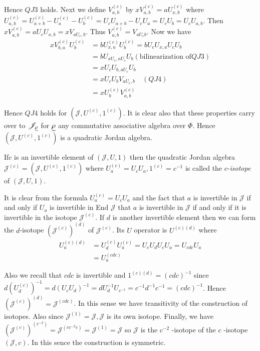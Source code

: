 Hence $QJ3$ holds. Next we define $V_{a,b}^{(c)}$ by
$xV_{a,b}^{(c)}=aU_{x,b}^{(c)}$ where
$U_{a,b}^{(c)}=U_{a+b}^{(c)}-U_a^{(c)}-U_b^{(c)}=U_cU_{a+b}-U_cU_a=U_cU_b=U_c
U_{a,b}$. Then $xV_{a,b}^{(c)}=aU_c U_{x,b}=xV_{aU_c,b}$. Thus
$V_{a,b}^{(c)}=V_{aU_{c}b}$. Now we have
\begin{align*}
  xV_{b,a}^{(c)}U_b^{(c)}&=bU_{x,a}^{(c)}U_b^{(c)}=bU_cU_{x,a}U_cU_b\\
  &=b U_{xU_c,aU_c}U_b(\text{bilinearization of} QJ 3)\\
  &=xU_c U_{b,aU_c}U_b\\
  &=xU_cU_b V_{aU_c,b}\quad (QJ 4)\\
  &=xU_b^{(c)}V_{a,b}^{(c)}
\end{align*}

Hence $QJ4$ holds for $(\mathscr{J}, U^{(c)},1^{(c)})$. It is clear
also that these properties carry over to $\mathscr{J}_{\underline{\rho}}$ for
$\underline{\rho}$ any commutative associative algebra over $\Phi$. Hence
$(\mathscr{J}, U^{(c)}, 1^{(c)})$ is a quadratic Jordan algebra.

\begin{defn}\label{c1:defn6}
  If\pageoriginale $c$ is an invertible element of $(\mathscr{J},U,1)$ then the
  quadratic Jordan algebra
  $\mathscr{J}^{(c)}=(\mathscr{J},U^{(c)},1^{(c)})$ where
  $U_a^{(c)}=U_cU_a,1^{(c)}=c^{-1}$ is called the $c$-{\em isotope} of
  $(\mathscr{J},U,1)$. 
\end{defn}

It is clear from the formula $U_a^{(c)}=U_cU_a$ and the fact that $a$
is invertible in $\mathscr{J}$ if and only if $U_a$ is invertible in
End $\mathscr{J}$ that $a$ is invertible in $\mathscr{J}$ if and only
if it is invertible in the isotope $\mathscr{J}^{(c)}$. If $d$ is
another invertible element then we can form the $d$-isotope
$(\mathscr{J}^{(c)})^{(d)}$ of $\mathscr{J}^{(c)}$. Its $U$ operator
is $U^{(c)(d)}$ where 
\begin{align*}
U_a^{(c)(d)}&=U_d^{(c)}U_a^{(c)}=U_cU_dU_cU_a=U_{cdc}U_a\\
&=U_a^{(cdc)}
\end{align*}

Also we recall that $cdc$ is invertible and $1^{(c)(d)}=(cdc)^{-1}$
since
$d(U_d^{(c)})^{-1}=d(U_cU_d)^{-1}=dU_{d}^{-1}U_{c^{-1}}=c^{-1}d^{-1}c^{-1}
= (cdc)^{-1}$. Hence
$(\mathscr{J}^{(c)})^{(d)}=\mathscr{J}^{(cdc)}$. In this sense we have
transitivity of the construction of isotopes. Also since
$\mathscr{J}^{(1)}=\mathscr{J},\mathscr{J}$ is its own
isotope. Finally, we have
$(\mathscr{J}^{(c)})^{(c^{-2})}=\mathscr{J}^{(cc^{-2}c)} =
\mathscr{J}^{(1)} = \mathscr{J}$
so $\mathscr{J}$ is  the $c^{-2}$ -isotope of the $c$ -isotope
$(\mathscr{J},c)$. In this sence the construction is symmetric.

